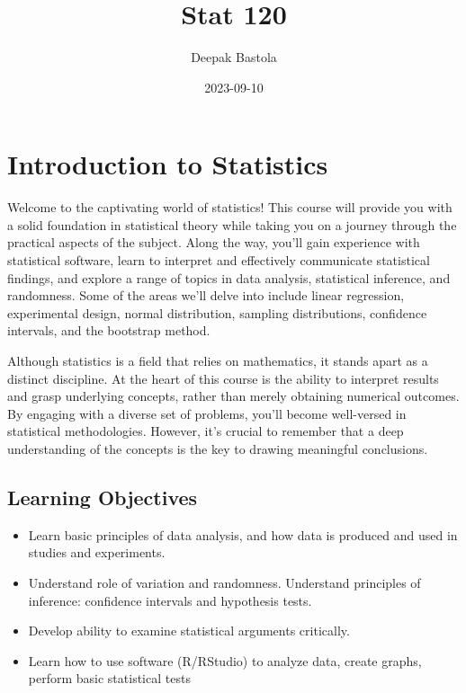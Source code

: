 \documentclass[
]{book}
\title{Stat 120}
\author{Deepak Bastola}
\date{2023-09-10}
\begin{document}
\maketitle

{
\setcounter{tocdepth}{1}
\tableofcontents
}
\hypertarget{introduction-to-statistics}{%
\chapter*{Introduction to Statistics}\label{introduction-to-statistics}}

Welcome to the captivating world of statistics! This course will provide you with a solid foundation in statistical theory while taking you on a journey through the practical aspects of the subject. Along the way, you'll gain experience with statistical software, learn to interpret and effectively communicate statistical findings, and explore a range of topics in data analysis, statistical inference, and randomness. Some of the areas we'll delve into include linear regression, experimental design, normal distribution, sampling distributions, confidence intervals, and the bootstrap method.

Although statistics is a field that relies on mathematics, it stands apart as a distinct discipline. At the heart of this course is the ability to interpret results and grasp underlying concepts, rather than merely obtaining numerical outcomes. By engaging with a diverse set of problems, you'll become well-versed in statistical methodologies. However, it's crucial to remember that a deep understanding of the concepts is the key to drawing meaningful conclusions.

\hypertarget{learning-objectives}{%
\section{Learning Objectives}\label{learning-objectives}}

\begin{itemize}
\item
  Learn basic principles of data analysis, and how data is produced and used in studies and experiments.
\item
  Understand role of variation and randomness. Understand principles of inference: confidence intervals and hypothesis tests.
\item
  Develop ability to examine statistical arguments critically.
\item
  Learn how to use software (R/RStudio) to analyze data, create graphs, perform basic statistical tests
\end{itemize}
\end{document}
